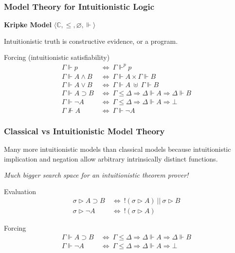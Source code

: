\documentclass[mathserif]{beamer}
\def\imp{\supset}
\def\dfn{~\Leftrightarrow~}
\def\arr{\Rightarrow}
\newcommand{\eval}[1]{\sigma \triangleright #1}
\newcommand{\force}[1]{\Gamma \Vdash #1}
\newcommand{\dforce}[1]{\Delta \Vdash #1}
\newcommand{\forcep}[1]{\Gamma \Vdash^p #1}
\newcommand{\nforce}[1]{\Gamma \nVdash #1}
\begin{document}
\begin{frame}
\frametitle{Model Theory for Intuitionistic Logic}

{\bf Kripke Model} $\langle \mathbb{C} , \leq , \varnothing , \Vdash \rangle$

Intuitionistic truth is constructive evidence, or a program.


\begin{block}{Forcing (intuitionistic satisfiability)}
\begin{align*}
\force{p} &\dfn \forcep{p}\\
\force{A \land B} &\dfn \force{A} \times \force{B}\\
\force{A \lor B} &\dfn \force{A} ~\uplus~ \force{B}\\
\force{A \imp B} &\dfn \Gamma \leq \Delta \arr \dforce{A} \arr \dforce{B}\\
\force{\neg A} &\dfn \Gamma \leq \Delta \arr \dforce{A} \arr \bot\\
\nforce{A} &\dfn \force{\neg A}
\end{align*}
\end{block}

\end{frame}

\begin{frame}
\frametitle{Classical vs Intuitionistic Model Theory}

Many more intuitionistic models than classical models
because intuitionistic implication and negation allow 
arbitrary intrinsically distinct functions.

{\it Much bigger search space for an intuitionistic theorem prover!}

\begin{block}{Evaluation}
\begin{align*}
\eval{A \imp B} &\dfn ! (\eval{A}) ~||~ \eval{B}\\
\eval{\neg A} &\dfn ! (\eval{A})
\end{align*}
\end{block}

\begin{block}{Forcing}
\begin{align*}
\force{A \imp B} &\dfn \Gamma \leq \Delta \arr \dforce{A} \arr \dforce{B}\\
\force{\neg A} &\dfn \Gamma \leq \Delta \arr \dforce{A} \arr \bot
\end{align*}
\end{block}


\end{frame}
\end{document}
